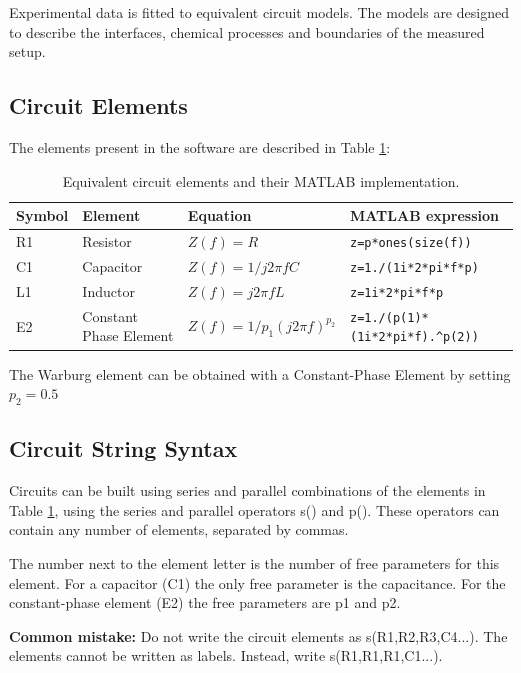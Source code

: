\documentclass[10pt,a4paper,oneside]{book}
\begin{document}
Experimental data is fitted to equivalent circuit models. The models are designed to describe the interfaces, chemical processes and boundaries of the measured setup.

\subsection{Circuit Elements}

The elements present in the software are described in Table \ref{circelements}:

\begin{table}[h]
	\centering
	\caption{Equivalent circuit elements and their MATLAB implementation.}
	\label{circelements}
	\begin{tabular}{llll}
		\hline \textbf{Symbol} & \textbf{Element} & \textbf{Equation} & \textbf{MATLAB expression}\\
		\hline R1 & Resistor & $Z(f) = R$ & \verb|z=p*ones(size(f))| \\ 
		C1 & Capacitor & $Z(f) = 1 / j 2\pi fC$ & \verb|z=1./(1i*2*pi*f*p)| \\ 
		L1 & Inductor & $Z(f) = j 2\pi fL$  & \verb|z=1i*2*pi*f*p| \\
		E2 & Constant Phase Element & $Z(f) = 1 / p_1 (j 2 \pi f)^{p_2} $ & \verb|z=1./(p(1)*(1i*2*pi*f).^p(2))| \\
		\hline
	\end{tabular}
\end{table}

The Warburg element can be obtained with a Constant-Phase Element by setting $p_2=0.5$


\subsection{Circuit String Syntax}

Circuits can be built using series and parallel combinations of the elements in Table \ref{circelements}, using the series and parallel operators s() and p(). These operators can contain any number of elements, separated by commas.

The number next to the element letter is the number of free parameters for this element. For a capacitor (C1) the only free parameter is the capacitance. For the constant-phase element (E2) the free parameters are p1 and p2.

\textbf{Common mistake:} Do not write the circuit elements as s(R1,R2,R3,C4...). The elements cannot be written as labels. Instead, write s(R1,R1,R1,C1...).
\end{document}
